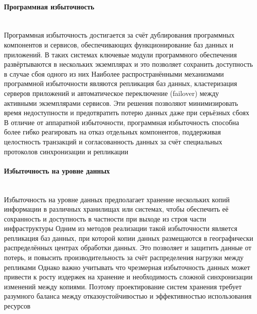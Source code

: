 \paragraph{Программная избыточность} ~\\
Программная избыточность достигается за счёт дублирования программных компонентов и сервисов, обеспечивающих функционирование баз данных и приложений. В таких системах ключевые модули программного обеспечения развёртываются в нескольких экземплярах и это позволяет сохранить доступность в случае сбоя одного из них %
Наиболее распространёнными механизмами программной избыточности являются репликация баз данных, кластеризация серверов приложений и автоматическое переключение (failover) между активными экземплярами сервисов. Эти решения позволяют минимизировать время недоступности и предотвратить потерю данных даже при серьёзных сбоях %
В отличие от аппаратной избыточности, программная избыточность способна более гибко реагировать на отказ отдельных компонентов, поддерживая целостность транзакций и согласованность данных за счёт специальных протоколов синхронизации и репликации %

\paragraph{Избыточность на уровне данных} ~\\
Избыточность на уровне данных предполагает хранение нескольких копий информации в различных хранилищах или системах, чтобы обеспечить её сохранность и доступность в частности при выходе из строя части инфраструктуры %
Одним из методов реализации такой избыточности является репликация баз данных, при которой копии данных размещаются в географически распределённых центрах обработки данных. Это позволяет и защитить данные от потерь, и повысить производительность за счёт распределения нагрузки между репликами %
Однако важно учитывать что чрезмерная избыточность данных может привести к росту издержек на хранение и необходимость сложной синхронизации изменений между копиями. Поэтому проектирование систем хранения требует разумного баланса между отказоустойчивостью и эффективностью использования ресурсов %

